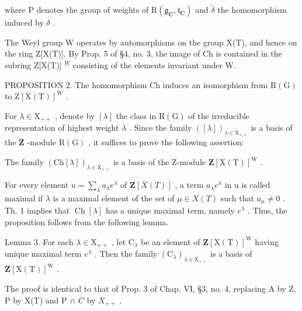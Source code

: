 where P denotes the group of weights of \(\mathrm{R}(\mathfrak{g}_{\mathbf{C}}, \mathfrak{t}_{\mathbf{C}})\) and \(\tilde{\delta}\) the homomorphism induced by \(\delta\) .

The Weyl group W operates by automorphisms on the group X(T), and hence on the ring Z[X(T)]. By Prop. 5 of §4, no. 3, the image of Ch is contained in the subring Z[X(T)] \(^{W}\) consisting of the elements invariant under W.

PROPOSITION 2. The homomorphism \(\mathrm{Ch}\) induces an isomorphism from \(\mathrm{R}(\mathrm{G})\) to \(\mathrm{Z}[\mathrm{X}(\mathrm{T})]^{\mathrm{W}}\) .

For \(\lambda \in \mathrm{X}_{++}\) , denote by \([\lambda]\) the class in \(\mathrm{R}(\mathrm{G})\) of the irreducible representation of highest weight \(\lambda\) . Since the family \(([\lambda])_{\lambda \in \mathrm{X}_{++}}\) is a basis of the \(\mathbf{Z}\) -module \(\mathrm{R}(\mathrm{G})\) , it suffices to prove the following assertion:

The family \((\mathrm{Ch}[\lambda])_{\lambda\in\mathrm{X}_{++}}\) is a basis of the Z-module \(\mathbf{Z}[\mathrm{X}(\mathrm{T})]^{\mathrm{W}}\) .

For every element \(u = \sum_{\lambda} a_{\lambda} e^{\lambda}\) of \(\mathbf{Z}[X(T)]\) , a term \(a_{\lambda} e^{\lambda}\) in u is called maximal if \(\lambda\) is a maximal element of the set of \(\mu \in X(T)\) such that \(a_{\mu} \neq 0\) . Th. 1 implies that \(\operatorname{Ch}[\lambda]\) has a unique maximal term, namely \(e^{\lambda}\) . Thus, the proposition follows from the following lemma.

Lemma 3. For each \(\lambda \in \mathrm{X}_{++}\) , let \(\mathrm{C}_{\lambda}\) be an element of \(\mathbf{Z}[\mathrm{X(T)}]^{\mathrm{W}}\) having unique maximal term \(e^{\lambda}\) . Then the family \((\mathrm{C}_{\lambda})_{\lambda \in \mathrm{X}_{++}}\) is a basis of \(\mathbf{Z}[\mathrm{X(T)}]^{\mathrm{W}}\) .

The proof is identical to that of Prop. 3 of Chap. VI, §3, no. 4, replacing A by Z, P by X(T) and P ∩ \(\overline{C}\) by \(X_{++}\) .

